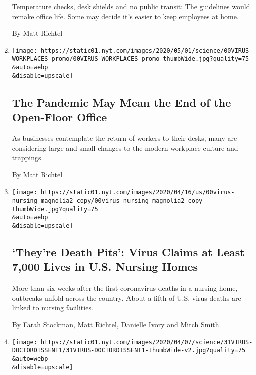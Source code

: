 \begin{enumerate}
  Temperature checks, desk shields and no public transit: The guidelines
  would remake office life. Some may decide it's easier to keep
  employees at home.

  By Matt Richtel
\item
  \href{/2020/05/04/health/coronavirus-office-makeover.html}{}

  \texttt{[image: https://static01.nyt.com/images/2020/05/01/science/00VIRUS-WORKPLACES-promo/00VIRUS-WORKPLACES-promo-thumbWide.jpg?quality=75\\\&auto=webp\\\&disable=upscale]}

  \hypertarget{the-pandemic-may-mean-the-end-of-the-open-floor-office}{%
  \subsection{The Pandemic May Mean the End of the Open-Floor
  Office}\label{the-pandemic-may-mean-the-end-of-the-open-floor-office}}

  As businesses contemplate the return of workers to their desks, many
  are considering large and small changes to the modern workplace
  culture and trappings.

  By Matt Richtel
\item
  \href{/2020/04/17/us/coronavirus-nursing-homes.html}{}

  \texttt{[image: https://static01.nyt.com/images/2020/04/16/us/00virus-nursing-magnolia2-copy/00virus-nursing-magnolia2-copy-thumbWide.jpg?quality=75\\\&auto=webp\\\&disable=upscale]}

  \hypertarget{theyre-death-pits-virus-claims-at-least-7000-lives-in-us-nursing-homes}{%
  \subsection{`They're Death Pits': Virus Claims at Least 7,000 Lives in
  U.S. Nursing
  Homes}\label{theyre-death-pits-virus-claims-at-least-7000-lives-in-us-nursing-homes}}

  More than six weeks after the first coronavirus deaths in a nursing
  home, outbreaks unfold across the country. About a fifth of U.S. virus
  deaths are linked to nursing facilities.

  By Farah Stockman, Matt Richtel, Danielle Ivory and Mitch Smith
\item
  \href{/2020/03/31/health/hospitals-coronavirus-face-masks.html}{}

  \texttt{[image: https://static01.nyt.com/images/2020/04/07/science/31VIRUS-DOCTORDISSENT1/31VIRUS-DOCTORDISSENT1-thumbWide-v2.jpg?quality=75\\\&auto=webp\\\&disable=upscale]}


\end{enumerate}
